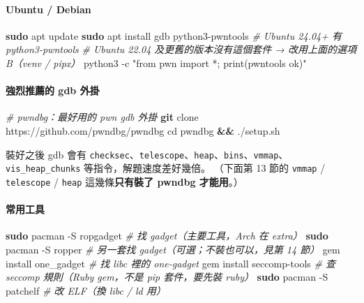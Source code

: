 \documentclass[10pt,a4paper]{article}
\newenvironment{Shaded}{\begin{snugshade}}{\end{snugshade}}
\newcommand{\AttributeTok}[1]{\textcolor[rgb]{0.13,0.29,0.53}{#1}}
\newcommand{\BuiltInTok}[1]{#1}
\newcommand{\CommentTok}[1]{\textcolor[rgb]{0.56,0.35,0.01}{\textit{#1}}}
\newcommand{\ExtensionTok}[1]{#1}
\newcommand{\FunctionTok}[1]{\textcolor[rgb]{0.13,0.29,0.53}{\textbf{#1}}}
\newcommand{\KeywordTok}[1]{\textcolor[rgb]{0.13,0.29,0.53}{\textbf{#1}}}
\newcommand{\NormalTok}[1]{#1}
\newcommand{\StringTok}[1]{\textcolor[rgb]{0.31,0.60,0.02}{#1}}
\renewenvironment{Shaded}{%
  \def\FrameCommand{\fboxsep=3.2pt\colorbox{shadecolor}}%
  \MakeFramed{\advance\hsize-\width\FrameRestore\small}%
}{%
  \endMakeFramed
}
\begin{document}
\paragraph{Ubuntu / Debian}\label{ubuntu-debian}

\begin{Shaded}
\begin{Highlighting}[]
\FunctionTok{sudo}\NormalTok{ apt update}
\FunctionTok{sudo}\NormalTok{ apt install gdb python3{-}pwntools    }\CommentTok{\# Ubuntu 24.04+ 有 python3{-}pwntools}
\CommentTok{\# Ubuntu 22.04 及更舊的版本沒有這個套件 → 改用上面的選項 B（venv / pipx）}
\ExtensionTok{python3} \AttributeTok{{-}c} \StringTok{"from pwn import *; print(\textquotesingle{}pwntools ok\textquotesingle{})"}
\end{Highlighting}
\end{Shaded}

\paragraph{強烈推薦的 gdb
外掛}\label{ux5f37ux70c8ux63a8ux85a6ux7684-gdb-ux5916ux639b}

\begin{Shaded}
\begin{Highlighting}[]
\CommentTok{\# pwndbg：最好用的 pwn gdb 外掛}
\FunctionTok{git}\NormalTok{ clone https://github.com/pwndbg/pwndbg}
\BuiltInTok{cd}\NormalTok{ pwndbg }\KeywordTok{\&\&} \ExtensionTok{./setup.sh}
\end{Highlighting}
\end{Shaded}

裝好之後 gdb 會有
\texttt{checksec}、\texttt{telescope}、\texttt{heap}、\texttt{bins}、\texttt{vmmap}、
\texttt{vis\_\allowbreak{}heap\_\allowbreak{}chunks} 等指令，解題速度差好幾倍。 （下面第 13 節的
\texttt{vmmap} / \texttt{telescope} / \texttt{heap}
這幾條\textbf{只有裝了 pwndbg 才能用}。）

\paragraph{常用工具}\label{ux5e38ux7528ux5de5ux5177}

\begin{Shaded}
\begin{Highlighting}[]
\FunctionTok{sudo}\NormalTok{ pacman }\AttributeTok{{-}S}\NormalTok{ ropgadget            }\CommentTok{\# 找 gadget（主要工具，Arch 在 extra）}
\FunctionTok{sudo}\NormalTok{ pacman }\AttributeTok{{-}S}\NormalTok{ ropper               }\CommentTok{\# 另一套找 gadget（可選；不裝也可以，見第 14 節）}
\ExtensionTok{gem}\NormalTok{  install one\_gadget             }\CommentTok{\# 找 libc 裡的 one{-}gadget}
\ExtensionTok{gem}\NormalTok{  install seccomp{-}tools          }\CommentTok{\# 查 seccomp 規則（Ruby gem，不是 pip 套件，要先裝 ruby）}
\FunctionTok{sudo}\NormalTok{ pacman }\AttributeTok{{-}S}\NormalTok{ patchelf             }\CommentTok{\# 改 ELF（換 libc / ld 用）}
\end{Highlighting}
\end{Shaded}
\end{document}
